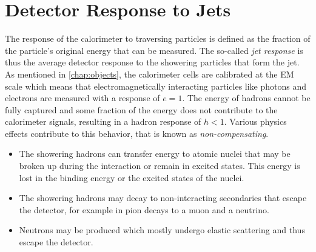 




\section{Detector Response to Jets}
\label{sec:detector-response}
The response of the calorimeter to traversing particles is defined as the fraction of the particle's original energy that can be measured. The so-called \emph{jet response} is thus the average detector response to the showering particles that form the jet.
As mentioned in \cref{chap:objects}, the calorimeter cells are calibrated at the EM scale which means that electromagnetically interacting particles like photons and electrons are measured with a response of $e = 1$. The energy of hadrons cannot be fully captured and some fraction of the energy does not contribute to the calorimeter signals, resulting in a hadron response of $h < 1$. Various physics effects contribute to this behavior, that is known as \emph{non-compensating}.
\begin{itemize}
    \item The showering hadrons can transfer energy to atomic nuclei that may be broken up during the interaction or remain in excited states. This energy is lost in the binding energy or the excited states of the nuclei.
    \item The showering hadrons may decay to non-interacting secondaries that escape the detector, for example in pion decays to a muon and a neutrino.
    \item Neutrons may be produced which mostly undergo elastic scattering and thus escape the detector.
\end{itemize}

